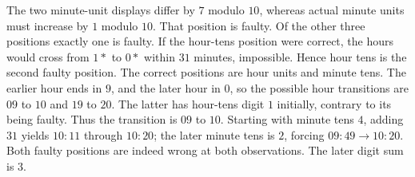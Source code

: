 The two minute-unit displays differ by $7$ modulo $10$, whereas actual minute units must increase by $1$ modulo $10$. That position is faulty. Of the other three positions exactly one is faulty. If the hour-tens position were correct, the hours would cross from $1\ast$ to $0\ast$ within $31$ minutes, impossible. Hence hour tens is the second faulty position. The correct positions are hour units and minute tens. The earlier hour ends in $9$, and the later hour in $0$, so the possible hour transitions are $09$ to $10$ and $19$ to $20$. The latter has hour-tens digit $1$ initially, contrary to its being faulty. Thus the transition is $09$ to $10$. Starting with minute tens $4$, adding $31$ yields $10{:}11$ through $10{:}20$; the later minute tens is $2$, forcing $09{:}49\to10{:}20$. Both faulty positions are indeed wrong at both observations. The later digit sum is $\boxed3$.
